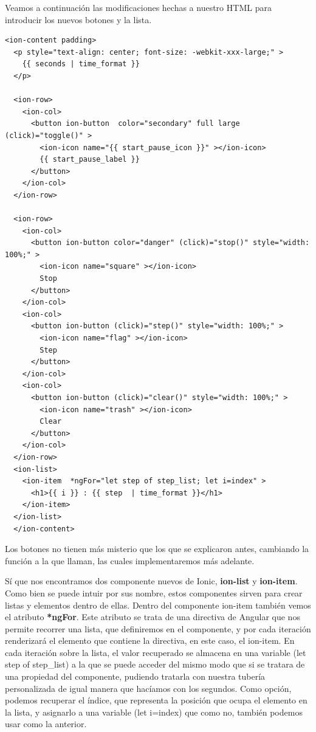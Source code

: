 Veamos a continuación las modificaciones hechas a nuestro \gls{HTML} para introducir los nuevos botones y la lista.

\begin{lstlisting}[style=htmlcssjs,frame=tlrb,xleftmargin={0.2cm}]
  <ion-content padding>
  <p style="text-align: center; font-size: -webkit-xxx-large;" >
    {{ seconds | time_format }}
  </p>

  <ion-row>
    <ion-col>
      <button ion-button  color="secondary" full large (click)="toggle()" >
        <ion-icon name="{{ start_pause_icon }}" ></ion-icon>
        {{ start_pause_label }}
      </button>
    </ion-col>
  </ion-row>

  <ion-row>
    <ion-col>
      <button ion-button color="danger" (click)="stop()" style="width: 100%;" >
        <ion-icon name="square" ></ion-icon>
        Stop
      </button>
    </ion-col>
    <ion-col>
      <button ion-button (click)="step()" style="width: 100%;" >
        <ion-icon name="flag" ></ion-icon>
        Step
      </button>
    </ion-col>
    <ion-col>
      <button ion-button (click)="clear()" style="width: 100%;" >
        <ion-icon name="trash" ></ion-icon>
        Clear
      </button>
    </ion-col>
  </ion-row>
  <ion-list>
    <ion-item  *ngFor="let step of step_list; let i=index" >
      <h1>{{ i }} : {{ step  | time_format }}</h1>
    </ion-item>
  </ion-list>
  </ion-content>
\end{lstlisting}

Los botones no tienen más misterio que los que se explicaron antes, cambiando la función a la que llaman, las cuales implementaremos más adelante.

Sí que nos encontramos dos componente nuevos de Ionic, \textbf{ion-list} y \textbf{ion-item}. Como bien se puede intuir por sus nombre, estos componentes sirven para crear listas y elementos dentro de ellas. Dentro del componente ion-item también vemos el atributo \textbf{*ngFor}. Este atributo se trata de una directiva de Angular que nos permite recorrer una lista, que definiremos en el componente, y por cada iteración renderizará el elemento que contiene la directiva, en este caso, el ion-item. En cada iteración sobre la lista, el valor recuperado se almacena en una variable (let step of step\_list) a la que se puede acceder del mismo modo que si se tratara de una propiedad del componente, pudiendo tratarla con nuestra tubería personalizada de igual manera que hacíamos con los segundos. Como opción, podemos recuperar el índice, que representa la posición que ocupa el elemento en la lista, y asignarlo a una variable (let i=index) que como no, también podemos usar como la anterior.

